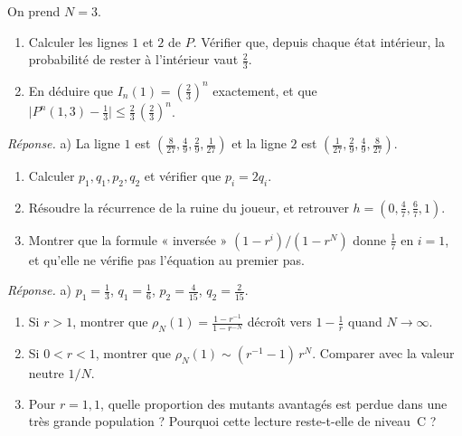 \begin{exercise}
On prend $N=3$.
\begin{enumerate}[label=\alph*),itemsep=0pt]
\item Calculer les lignes $1$ et $2$ de $P$. Vérifier que, depuis chaque état intérieur, la probabilité de rester
à l'intérieur vaut $\frac23$.
\item En déduire que $I_n(1)=(\frac23)^n$ exactement, et que $\bigl|P^n(1,3)-\frac13\bigr|\le\frac23\,(\frac23)^n$.
\end{enumerate}
\emph{Réponse.} a) La ligne $1$ est $(\frac8{27},\frac49,\frac29,\frac1{27})$ et la ligne $2$ est
$(\frac1{27},\frac29,\frac49,\frac8{27})$.
\end{exercise}

\begin{exercise}[Moran, $N=3$, $r=2$]\label{ch4:ex:moran3}
\begin{enumerate}[label=\alph*),itemsep=0pt]
\item Calculer $p_1,q_1,p_2,q_2$ et vérifier que $p_i=2q_i$.
\item Résoudre la récurrence de la ruine du joueur, et retrouver $h=(0,\frac47,\frac67,1)$.
\item Montrer que la formule « inversée » $(1-r^i)/(1-r^N)$ donne $\frac17$ en $i=1$, et qu'elle ne vérifie pas
l'équation au premier pas.
\end{enumerate}
\emph{Réponse.} a) $p_1=\frac13$, $q_1=\frac16$, $p_2=\frac4{15}$, $q_2=\frac2{15}$.
\end{exercise}

\begin{exercise}
\begin{enumerate}[label=\alph*),itemsep=0pt]
\item Si $r>1$, montrer que $\rho_N(1)=\frac{1-r^{-1}}{1-r^{-N}}$ décroît vers $1-\frac1r$ quand $N\to\infty$.
\item Si $0<r<1$, montrer que $\rho_N(1)\sim(r^{-1}-1)\,r^N$. Comparer avec la valeur neutre $1/N$.
\item Pour $r=1{,}1$, quelle proportion des mutants avantagés est perdue dans une très grande population ? Pourquoi
cette lecture reste-t-elle de niveau~C ?
\end{enumerate}
\end{exercise}

